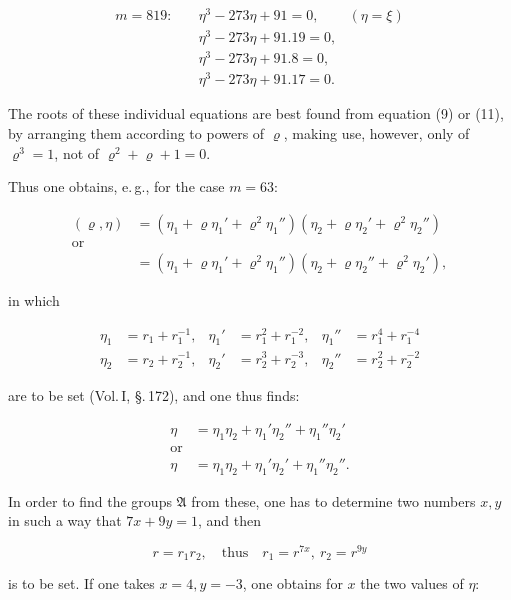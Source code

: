 \[ \begin{aligned}
m = 819:\quad &\eta^3 - 273\eta + 91 = 0, & (\eta = \xi) \\
&\eta^3 - 273\eta + 91 . 19 = 0, \\
&\eta^3 - 273\eta + 91 . 8 = 0, \\
&\eta^3 - 273\eta + 91 . 17 = 0.
\end{aligned} \]

The roots of these individual equations are best found from equation (9)
or (11), by arranging them according to powers of $\varrho$, making use,
however, only of $\varrho^3 = 1$, not of $\varrho^2 + \varrho + 1 = 0$.

Thus one obtains, e.\,g., for the case $m = 63$:

\[ \begin{aligned}
(\varrho, \eta) &= (\eta_1 + \varrho\eta_1' + \varrho^2\eta_1'')(\eta_2 + \varrho\eta_2' + \varrho^2\eta_2'') \\
\text{or} \\
&= (\eta_1 + \varrho\eta_1' + \varrho^2\eta_1'')(\eta_2 + \varrho\eta_2'' + \varrho^2\eta_2'),
\end{aligned} \]

in which

\[ \begin{aligned}
\eta_1 &= r_1 + r_1^{-1}, & \eta_1' &= r_1^2 + r_1^{-2}, & \eta_1'' &= r_1^4 + r_1^{-4} \\
\eta_2 &= r_2 + r_2^{-1}, & \eta_2' &= r_2^3 + r_2^{-3}, & \eta_2'' &= r_2^2 + r_2^{-2}
\end{aligned} \]

are to be set (Vol.\,I, \S.\,172), and one thus finds:

\[ \begin{aligned}
\eta &= \eta_1\eta_2 + \eta_1'\eta_2'' + \eta_1''\eta_2' \\
\text{or} \\
\eta &= \eta_1\eta_2 + \eta_1'\eta_2' + \eta_1''\eta_2''.
\end{aligned} \]

In order to find the groups $\mathfrak{A}$ from these, one has to determine
two numbers $x, y$ in such a way that $7x + 9y = 1$, and then

\[ r = r_1 r_2, \quad \text{thus} \quad r_1 = r^{7x}, \ r_2 = r^{9y} \]

is to be set. If one takes $x = 4, y = -3$, one obtains for $x$ the two values %
of $\eta$:

